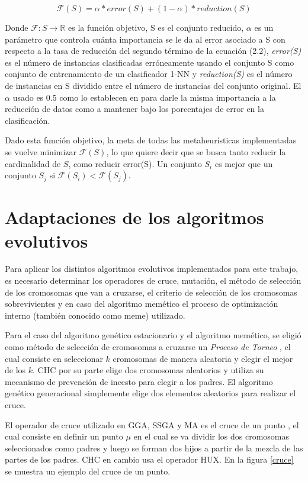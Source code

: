 \begin{equation}
\mathcal{F}(S) = \alpha * error(S) + (1 - \alpha) * reduction(S)
\end{equation} 

Donde $\mathcal{F}: S \rightarrow \mathbb{R}$ es la función objetivo, S es el conjunto reducido, $\alpha$ es un parámetro que controla cuánta importancia se le da al error asociado a S con respecto a la tasa de reducción del segundo término de la ecuación (2.2), \emph{error(S)} es el número de instancias clasificadas erróneamente usando el conjunto S como conjunto de entrenamiento de un clasificador 1-NN y \emph{reduction(S)} es el número de instancias en S dividido entre el número de instancias del conjunto original. El $\alpha$ usado es 0.5 como lo establecen en \cite{de2004reduccion} para darle la misma importancia a la reducción de datos como a mantener bajo los porcentajes de error en la clasificación.

Dado esta función objetivo, la meta de todas las metaheurísticas implementadas se vuelve minimizar $\mathcal{F}(S)$, lo que quiere decir que se busca tanto reducir la cardinalidad de $S$, como reducir error(S). Un conjunto $S_i$ es mejor que un conjunto $S_j$ si $\mathcal{F}(S_i) < \mathcal{F}(S_j)$.  

\section{Adaptaciones de los algoritmos evolutivos}

Para aplicar los distintos algoritmos evolutivos implementados para este trabajo, es necesario determinar los operadores de cruce, mutación, el método de selección de los cromosomas que van a cruzarse, el criterio de selección de los cromosomas sobrevivientes y en caso del algoritmo memético el proceso de optimización interno (también conocido como meme) utilizado.

Para el caso del algoritmo genético estacionario y el algoritmo memético, se eligió como método de selección de cromosomas a cruzarse un \emph{Proceso de Torneo} \cite{talbi2009metaheuristics}, el cual consiste en seleccionar $k$ cromosomas de manera aleatoria y elegir el mejor de los $k$. CHC por su parte elige dos cromosomas aleatorios y utiliza su mecanismo de prevención de incesto para elegir a los padres. El algoritmo genético generacional simplemente elige dos elementos aleatorios para realizar el cruce.

El operador de cruce utilizado en GGA, SSGA y MA es el cruce de un punto \cite{talbi2009metaheuristics}, el cual consiste en definir un punto $\mu$ en el cual se va dividir los dos cromosomas seleccionados como padres y luego se forman dos hijos a partir de la mezcla de las partes de los padres. CHC en cambio usa el operador HUX. En la figura \ref{cruce} se muestra un ejemplo del cruce de un punto. 

